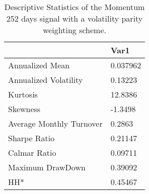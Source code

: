 \begin{table}[H]
\centering
\begin{tabular}{ll}
\hline& Var1 \\ 
\hline 
Annualized Mean & 0.037962 \\ 
Annualized Volatility & 0.13223 \\ 
Kurtosis & 12.8386 \\ 
Skewness & -1.3498 \\ 
Average Monthly Turnover & 0.2863 \\ 
Sharpe Ratio & 0.21147 \\ 
Calmar Ratio & 0.09711 \\ 
Maximum DrawDown & 0.39092 \\ 
HH* & 0.45467 \\ 
\hline
\end{tabular}
\caption{Descriptive Statistics of the Momentum 252 days signal with a volatility parity weighting scheme.}
\label{MOM252VP}
\end{table}